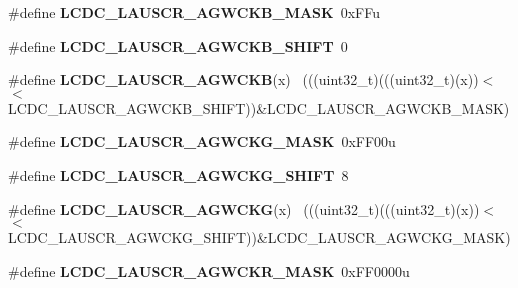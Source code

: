 \begin{DoxyCompactItemize}
\item 
\hypertarget{group___l_c_d_c___register___masks_gaa49c7a5f5303c97dce0373dccb2cd39b}{}\#define {\bfseries L\+C\+D\+C\+\_\+\+L\+A\+U\+S\+C\+R\+\_\+\+A\+G\+W\+C\+K\+B\+\_\+\+M\+A\+S\+K}~0x\+F\+Fu\label{group___l_c_d_c___register___masks_gaa49c7a5f5303c97dce0373dccb2cd39b}

\item 
\hypertarget{group___l_c_d_c___register___masks_gaab161a22ecb5ad1504c1aa501ee96293}{}\#define {\bfseries L\+C\+D\+C\+\_\+\+L\+A\+U\+S\+C\+R\+\_\+\+A\+G\+W\+C\+K\+B\+\_\+\+S\+H\+I\+F\+T}~0\label{group___l_c_d_c___register___masks_gaab161a22ecb5ad1504c1aa501ee96293}

\item 
\hypertarget{group___l_c_d_c___register___masks_ga815b28de14e223a0a299d94e19a1c92a}{}\#define {\bfseries L\+C\+D\+C\+\_\+\+L\+A\+U\+S\+C\+R\+\_\+\+A\+G\+W\+C\+K\+B}(x)                                    ~(((uint32\+\_\+t)(((uint32\+\_\+t)(x))$<$$<$L\+C\+D\+C\+\_\+\+L\+A\+U\+S\+C\+R\+\_\+\+A\+G\+W\+C\+K\+B\+\_\+\+S\+H\+I\+F\+T))\&L\+C\+D\+C\+\_\+\+L\+A\+U\+S\+C\+R\+\_\+\+A\+G\+W\+C\+K\+B\+\_\+\+M\+A\+S\+K)\label{group___l_c_d_c___register___masks_ga815b28de14e223a0a299d94e19a1c92a}

\item 
\hypertarget{group___l_c_d_c___register___masks_ga7627fcb5fc51abc3b576d2cd099209b2}{}\#define {\bfseries L\+C\+D\+C\+\_\+\+L\+A\+U\+S\+C\+R\+\_\+\+A\+G\+W\+C\+K\+G\+\_\+\+M\+A\+S\+K}~0x\+F\+F00u\label{group___l_c_d_c___register___masks_ga7627fcb5fc51abc3b576d2cd099209b2}

\item 
\hypertarget{group___l_c_d_c___register___masks_ga50663da6f7b176039e3772cda03ca86a}{}\#define {\bfseries L\+C\+D\+C\+\_\+\+L\+A\+U\+S\+C\+R\+\_\+\+A\+G\+W\+C\+K\+G\+\_\+\+S\+H\+I\+F\+T}~8\label{group___l_c_d_c___register___masks_ga50663da6f7b176039e3772cda03ca86a}

\item 
\hypertarget{group___l_c_d_c___register___masks_gaba1cb5c7c7daf74558fddf046c838ca8}{}\#define {\bfseries L\+C\+D\+C\+\_\+\+L\+A\+U\+S\+C\+R\+\_\+\+A\+G\+W\+C\+K\+G}(x)                                    ~(((uint32\+\_\+t)(((uint32\+\_\+t)(x))$<$$<$L\+C\+D\+C\+\_\+\+L\+A\+U\+S\+C\+R\+\_\+\+A\+G\+W\+C\+K\+G\+\_\+\+S\+H\+I\+F\+T))\&L\+C\+D\+C\+\_\+\+L\+A\+U\+S\+C\+R\+\_\+\+A\+G\+W\+C\+K\+G\+\_\+\+M\+A\+S\+K)\label{group___l_c_d_c___register___masks_gaba1cb5c7c7daf74558fddf046c838ca8}

\item 
\hypertarget{group___l_c_d_c___register___masks_gab9842a2eb29f02ddfc37d7f8818c6a27}{}\#define {\bfseries L\+C\+D\+C\+\_\+\+L\+A\+U\+S\+C\+R\+\_\+\+A\+G\+W\+C\+K\+R\+\_\+\+M\+A\+S\+K}~0x\+F\+F0000u\label{group___l_c_d_c___register___masks_gab9842a2eb29f02ddfc37d7f8818c6a27}


\end{DoxyCompactItemize}
